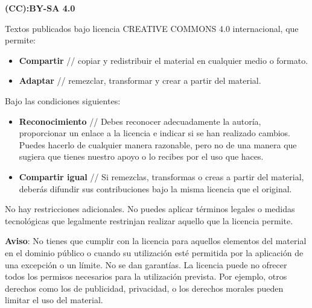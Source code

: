 
\thispagestyle{empty}
\sffamily

\begin{flushleft}\scriptsize
\textbf{(CC):BY-SA 4.0}

\vspace{.5\baselineskip}

Textos publicados bajo licencia CREATIVE COMMONS 4.0 internacional, que permite:

\begin{itemize}
\item \textbf{Compartir} // copiar y redistribuir el material en cualquier medio o formato.
\item \textbf{Adaptar} // remezclar, transformar y crear a partir del material.
\end{itemize}

Bajo las condiciones siguientes:

\begin{itemize}
\item \textbf{Reconocimiento} // Debes reconocer adecuadamente la autoría, proporcionar un enlace a la licencia e indicar si se han realizado cambios. Puedes hacerlo de cualquier manera razonable, pero no de una manera que sugiera que tienes nuestro apoyo o lo recibes por el uso que haces.
\item \textbf{Compartir igual} // Si remezclas, transformas o creas a partir del material, deberás difundir sus contribuciones bajo la misma licencia que el original.
\end{itemize}

No hay restricciones adicionales. No puedes aplicar términos legales o medidas tecnológicas que legalmente restrinjan realizar aquello que la licencia permite.

\vspace{1.0\baselineskip}

\textbf{Aviso}: No tienes que cumplir con la licencia para aquellos elementos del material en el dominio público o cuando su utilización esté permitida por la aplicación de una excepción o un límite. No se dan garantías. La licencia puede no ofrecer todos los permisos necesarios para la utilización prevista. Por ejemplo, otros derechos como los de publicidad, privacidad, o los derechos morales pueden limitar el uso del material.

\vspace{1.0\baselineskip}


\end{flushleft}
